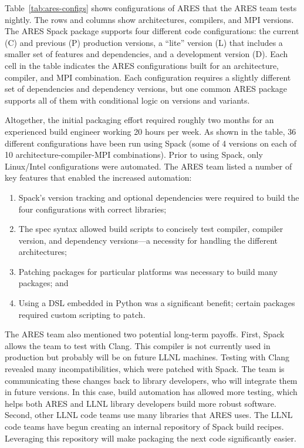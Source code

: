 Table~\ref{tab:ares-configs} shows configurations of ARES that the ARES
team tests nightly.  The rows and columns show architectures, compilers, and MPI versions.
The ARES Spack package supports four different code configurations:
the current (C) and previous (P) production versions, a ``lite'' version (L) that includes
a smaller set of features and dependencies, and a development version (D).
Each cell in the table indicates the ARES configurations built for an architecture,
compiler, and MPI combination. Each configuration requires a slightly different
set of dependencies and dependency versions, but one common ARES package supports
all of them with conditional logic on versions and variants.

Altogether, the initial packaging effort required roughly two months 
for an experienced build engineer working 20 hours per week.
As shown in the table, 36 different configurations have been run using Spack
(some of 4 versions on each of 10 architecture-compiler-MPI combinations).
Prior to using Spack, only Linux/Intel configurations were automated. The ARES 
team listed a number of key features that enabled the increased automation:
\begin{enumerate}
\item Spack's version tracking and optional dependencies were required to
      build the four configurations with correct libraries;
\item The spec syntax allowed build scripts to concisely test compiler,
      compiler version, and dependency versions---a necessity
      for handling the different architectures;
\item Patching packages for particular platforms was
      necessary to build many packages; and
\item Using a DSL embedded in Python was a significant benefit;
      certain packages required custom scripting to patch.
\end{enumerate}

The ARES team also mentioned two potential long-term payoffs. First, Spack 
allows the team to test with Clang.  This compiler is not currently used in
production but probably will be on future LLNL machines. Testing with Clang 
revealed many incompatibilities, which were patched with Spack. The team is 
communicating these changes back to library developers, who will integrate 
them in future versions. In this case, build automation has allowed more 
testing, which helps both ARES and LLNL library developers build more robust 
software. Second, other LLNL code teams use many libraries that ARES uses.
The LLNL code teams have begun creating an internal repository of Spack 
build recipes.  Leveraging this repository will make packaging the next 
code significantly easier.
